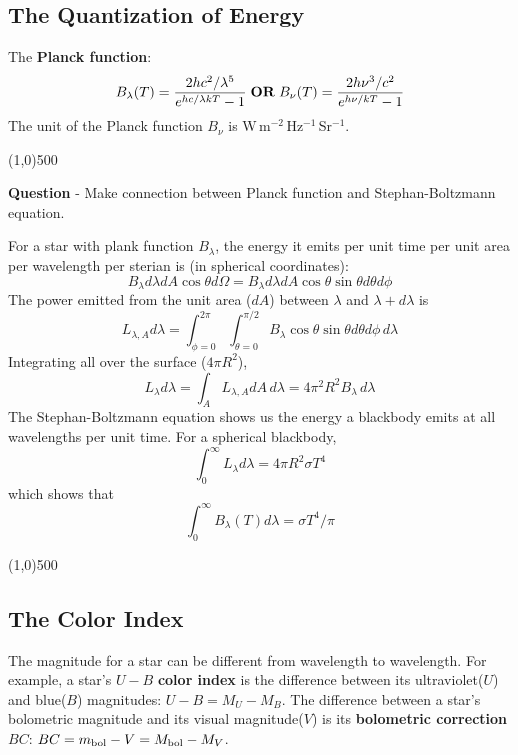 \documentclass{article}
\numberwithin{equation}{section}
\numberwithin{figure}{section}
\newcommand{\hr}{\begin{center} \line(1,0){500} \end{center}}
\begin{document}
	\subsection{The Quantization of Energy}
	The {\bf Planck function}:
	\begin{equation}
		B_\lambda(T) = \frac{2hc^2/\lambda^5}{e^{hc/\lambda kT}-1}\;{\bf OR}\; 
		B_\nu(T) = \frac{2h\nu^3/c^2}{e^{h\nu/kT}-1}
	\end{equation}
	The unit of the Planck function $B_\nu$ is W\,m$^{-2}$\,Hz$^{-1}$\,Sr$^{-1}$.
	
	\hr {\bf Question} - Make connection between Planck function and Stephan-Boltzmann equation.
	
	For a star with plank function $B_\lambda$, the energy it emits per unit time per unit area per wavelength per sterian is (in spherical coordinates):
	\begin{equation}
		B_\lambda d\lambda dA \cos\theta d\Omega = B_\lambda d\lambda dA \cos\theta \sin\theta d\theta d\phi
	\end{equation}
	The power emitted from the unit area ($dA$) between $\lambda$ and $\lambda+d\lambda$ is
	\begin{equation}
		L_{\lambda,A}d\lambda = \int_{\phi=0}^{2\pi}\int_{\theta=0}^{\pi/2}B_\lambda\cos\theta \sin\theta d\theta d\phi\,d\lambda
	\end{equation}
	Integrating all over the surface ($4\pi R^2$),
	\begin{equation}
		L_\lambda d\lambda = \int_A L_{\lambda,A}dA\,d\lambda = 4\pi^2R^2B_\lambda\,d\lambda
	\end{equation}
	The Stephan-Boltzmann equation shows us the energy a blackbody emits at all wavelengths per unit time. For a spherical blackbody, 
	\begin{equation}
		\int_0^\infty L_\lambda d\lambda = 4\pi R^2\sigma T^4
	\end{equation}
	which shows that
	\begin{equation}
		\int_0^\infty B_\lambda(T) d\lambda =\sigma T^4 / \pi
	\end{equation}
	\hr
	
	\subsection{The Color Index}
	The magnitude for a star can be different from wavelength to wavelength. For example, a star's $U-B$ {\bf color index} is the difference between its ultraviolet($U$) and blue($B$) magnitudes: $U-B = M_U - M_B$.
	The difference between a star's bolometric magnitude and its visual magnitude($V$) is its {\bf bolometric correction} $BC$: $BC = m_{\rm bol} - V = M_{\rm bol} - M_V$.
	
\end{document}
